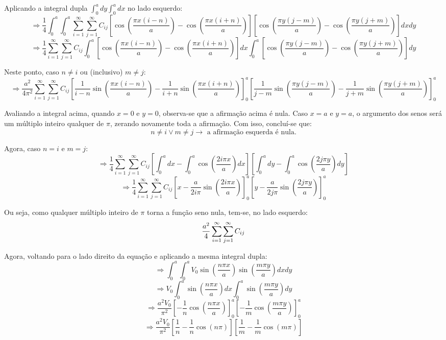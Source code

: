 \documentclass{report}
\begin{document}
Aplicando a integral dupla $ \int_{0}^{a}dy\int_{0}^{a}dx $ no lado esquerdo:
$$ \textstyle \Rightarrow \frac{1}{4}\int_{0}^{a}\int_{0}^{a}\sum_{i=1}^{\infty} \sum_{j=1}^{\infty} C_{ij}\left[\cos\left(\frac{\pi x(i - n)}{a}\right) - \cos\left(\frac{\pi x(i + n)}{a}\right)\right]\left[\cos\left(\frac{\pi y(j - m)}{a}\right) - \cos\left(\frac{\pi y(j + m)}{a}\right)\right]dxdy $$
$$ \textstyle \Rightarrow \frac{1}{4} \sum_{i=1}^{\infty} \sum_{j=1}^{\infty} C_{ij} \int_{0}^{a} \left[\cos\left(\frac{\pi x(i - n)}{a}\right) - \cos\left(\frac{\pi x(i + n)}{a}\right)\right]dx\int_{0}^{a}\left[\cos\left(\frac{\pi y(j - m)}{a}\right) - \cos\left(\frac{\pi y(j + m)}{a}\right)\right]dy $$

Neste ponto, caso $ n \neq i $ ou (inclusivo) $ m \neq j $:
$$ \scriptstyle \Rightarrow \frac{a^2}{4\pi^2} \sum_{i=1}^{\infty} \sum_{j=1}^{\infty} C_{ij} \left[\frac{1}{i - n}\sin\left(\frac{\pi x(i - n)}{a}\right) - \frac{1}{i + n}\sin\left(\frac{\pi x(i + n)}{a}\right)\right]_{0}^{a} \left[\frac{1}{j - m}\sin\left(\frac{\pi y(j - m)}{a}\right) - \frac{1}{j + m}\sin\left(\frac{\pi y(j + m)}{a}\right)\right]_{0}^{a} $$

Avaliando a integral acima, quando $ x = 0 $ e $ y = 0 $, observa-se que a afirmação acima é nula. Caso $ x = a $ e $ y = a $, o argumento dos senos será um múltiplo inteiro qualquer de $ \pi $, zerando novamente toda a afirmação. Com isso, concluí-se que:
$$ n \neq i \lor m \neq j \rightarrow \text{ a afirmação esquerda é nula.} $$

Agora, caso $ n = i $ e $ m = j $:
$$ \Rightarrow \frac{1}{4} \sum_{i=1}^{\infty} \sum_{j=1}^{\infty} C_{ij} \left[\int_{0}^{a}dx - \int_{0}^{a}\cos\left(\frac{2i\pi x}{a}\right)dx\right]\left[\int_{0}^{a}dy - \int_{0}^{a}\cos\left(\frac{2j\pi y}{a}\right)dy\right] $$
$$ \Rightarrow \frac{1}{4} \sum_{i=1}^{\infty} \sum_{j=1}^{\infty} C_{ij} \left[x - \frac{a}{2i\pi}\sin\left(\frac{2i\pi x}{a}\right)\right]_{0}^{a}\left[y - \frac{a}{2j\pi}\sin\left(\frac{2j\pi y}{a}\right)\right]_{0}^{a} $$

Ou seja, como qualquer múltiplo inteiro de $ \pi $ torna a função seno nula, tem-se, no lado esquerdo:
\begin{equation}
  \label{eq:Cij_left}
  \centering
  \frac{a^2}{4} \sum_{i=1}^{\infty} \sum_{j=1}^{\infty} C_{ij}
\end{equation}

Agora, voltando para o lado direito da equação e aplicando a mesma integral dupla:
$$ \Rightarrow \int_{0}^{a} \int_{0}^{a} V_0\sin\left(\frac{n\pi x}{a}\right)\sin\left(\frac{m\pi y}{a}\right)dxdy $$
$$ \Rightarrow V_0 \int_{0}^{a} \sin\left(\frac{n\pi x}{a}\right)dx \int_{0}^{a} \sin\left(\frac{m\pi y}{a}\right)dy $$
$$ \Rightarrow \frac{a^2V_0}{\pi^2} \left[-\frac{1}{n}\cos\left(\frac{n\pi x}{a}\right)\right]_{0}^{a} \left[-\frac{1}{m}\cos\left(\frac{m\pi y}{a}\right)\right]_{0}^{a} $$
$$ \Rightarrow \frac{a^2V_0}{\pi^2} \left[\frac{1}{n} - \frac{1}{n}\cos\left(n\pi\right)\right] \left[\frac{1}{m} - \frac{1}{m}\cos\left(m\pi\right)\right] $$
\end{document}
